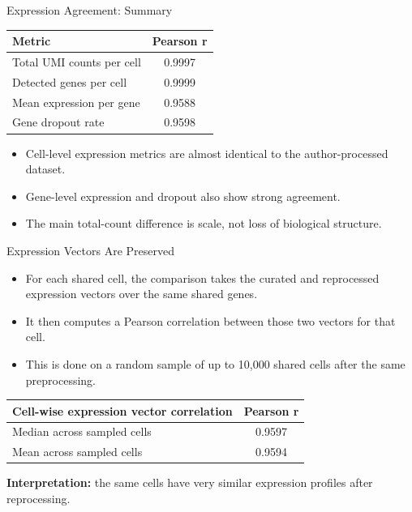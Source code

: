 \documentclass[handout,aspectratio=169]{beamer}
\begin{document}
\begin{frame}{Expression Agreement: Summary}
    \centering
    \begin{tabular}{lc}
        \toprule
        \textbf{Metric} & \textbf{Pearson r} \\
        \midrule
        Total UMI counts per cell & 0.9997 \\
        Detected genes per cell & 0.9999 \\
        Mean expression per gene & 0.9588 \\
        Gene dropout rate & 0.9598 \\
        \bottomrule
    \end{tabular}
    \vspace{1.0em}
    \begin{itemize}
        \item Cell-level expression metrics are almost identical to the author-processed dataset.
        \item Gene-level expression and dropout also show strong agreement.
        \item The main total-count difference is scale, not loss of biological structure.
    \end{itemize}
\end{frame}

\begin{frame}{Expression Vectors Are Preserved}
    \begin{itemize}
        \item For each shared cell, the comparison takes the curated and reprocessed expression vectors over the same shared genes.
        \item It then computes a Pearson correlation between those two vectors for that cell.
        \item This is done on a random sample of up to 10,000 shared cells after the same preprocessing.
    \end{itemize}
    \vspace{1.0em}
    \centering
    \begin{tabular}{lc}
        \toprule
        \textbf{Cell-wise expression vector correlation} & \textbf{Pearson r} \\
        \midrule
        Median across sampled cells & 0.9597 \\
        Mean across sampled cells & 0.9594 \\
        \bottomrule
    \end{tabular}
    \vspace{1.0em}

    \textbf{Interpretation:} the same cells have very similar expression profiles after reprocessing.
\end{frame}
\end{document}
